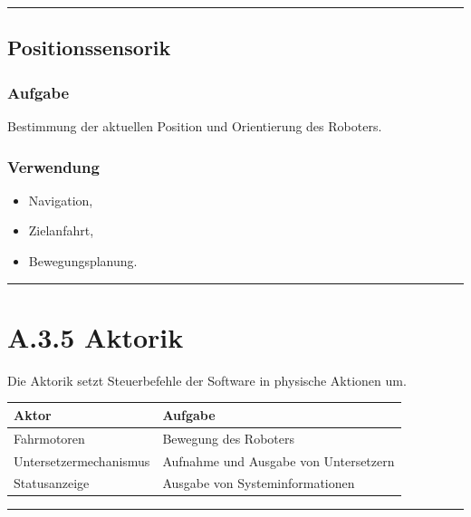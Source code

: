 \documentclass[
]{article}
\providecommand{\tightlist}{%
  \setlength{\itemsep}{0pt}\setlength{\parskip}{0pt}}
\begin{document}
\begin{center}\rule{0.5\linewidth}{0.5pt}\end{center}

\subsection{Positionssensorik}\label{positionssensorik-1}

\subsubsection{Aufgabe}\label{aufgabe-5}

Bestimmung der aktuellen Position und Orientierung des Roboters.

\subsubsection{Verwendung}\label{verwendung-2}

\begin{itemize}
\tightlist
\item
  Navigation,
\item
  Zielanfahrt,
\item
  Bewegungsplanung.
\end{itemize}

\begin{center}\rule{0.5\linewidth}{0.5pt}\end{center}

\section{A.3.5 Aktorik}\label{a.3.5-aktorik}

Die Aktorik setzt Steuerbefehle der Software in physische Aktionen um.

\begin{longtable}[]{@{}ll@{}}
\toprule\noalign{}
Aktor & Aufgabe \\
\midrule\noalign{}
\endhead
\bottomrule\noalign{}
\endlastfoot
Fahrmotoren & Bewegung des Roboters \\
Untersetzermechanismus & Aufnahme und Ausgabe von Untersetzern \\
Statusanzeige & Ausgabe von Systeminformationen \\
\end{longtable}

\begin{center}\rule{0.5\linewidth}{0.5pt}\end{center}
\end{document}
